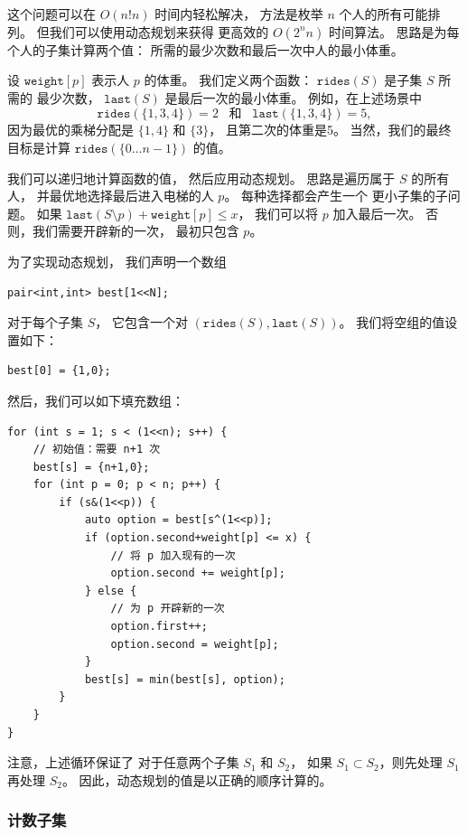 这个问题可以在 $O(n! n)$ 时间内轻松解决，
方法是枚举 $n$ 个人的所有可能排列。
但我们可以使用动态规划来获得
更高效的 $O(2^n n)$ 时间算法。
思路是为每个人的子集计算两个值：
所需的最少次数和最后一次中人的最小体重。

设 $\texttt{weight}[p]$ 表示人 $p$ 的体重。
我们定义两个函数：
$\texttt{rides}(S)$ 是子集 $S$ 所需的
最少次数，
$\texttt{last}(S)$ 是最后一次的最小体重。
例如，在上述场景中
\[ \texttt{rides}(\{1,3,4\})=2 \hspace{10pt} \textrm{和}
\hspace{10pt} \texttt{last}(\{1,3,4\})=5,\]
因为最优的乘梯分配是 $\{1,4\}$ 和 $\{3\}$，
且第二次的体重是5。
当然，我们的最终目标是计算
$\texttt{rides}(\{0 \ldots n-1\})$ 的值。

我们可以递归地计算函数的值，
然后应用动态规划。
思路是遍历属于 $S$ 的所有人，
并最优地选择最后进入电梯的人 $p$。
每种选择都会产生一个
更小子集的子问题。
如果 $\texttt{last}(S \setminus p)+\texttt{weight}[p] \le x$，
我们可以将 $p$ 加入最后一次。
否则，我们需要开辟新的一次，
最初只包含 $p$。

为了实现动态规划，
我们声明一个数组
\begin{lstlisting}
pair<int,int> best[1<<N];
\end{lstlisting}
对于每个子集 $S$，
它包含一个对 $(\texttt{rides}(S),\texttt{last}(S))$。
我们将空组的值设置如下：
\begin{lstlisting}
best[0] = {1,0};
\end{lstlisting}
然后，我们可以如下填充数组：

\begin{lstlisting}
for (int s = 1; s < (1<<n); s++) {
    // 初始值：需要 n+1 次
    best[s] = {n+1,0};
    for (int p = 0; p < n; p++) {
        if (s&(1<<p)) {
            auto option = best[s^(1<<p)];
            if (option.second+weight[p] <= x) {
                // 将 p 加入现有的一次
                option.second += weight[p];
            } else {
                // 为 p 开辟新的一次
                option.first++;
                option.second = weight[p];
            }
            best[s] = min(best[s], option);
        }
    }
}
\end{lstlisting}
注意，上述循环保证了
对于任意两个子集 $S_1$ 和 $S_2$，
如果 $S_1 \subset S_2$，则先处理 $S_1$ 再处理 $S_2$。
因此，动态规划的值是以正确的顺序计算的。

\subsubsection{计数子集}

